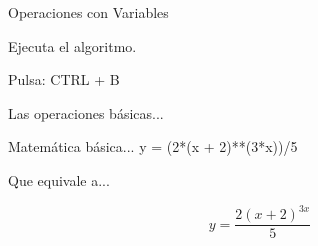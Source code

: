\begin{frame}[t]{Operaciones con Variables}\vspace{10pt}

Ejecuta el algoritmo.
\begin{block}{Pulsa:}
	CTRL + B
\end{block}

Las operaciones básicas...
\begin{block}{Matemática básica...}
	y = (2*(x + 2)**(3*x))/5
\end{block}

Que equivale a...

\begin{equation}
	y = \frac{2 \left(x  + 2 \right)^{3x}}{5}
\end{equation}

\end{frame}